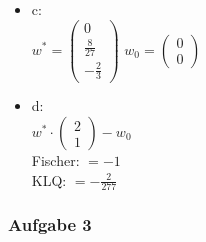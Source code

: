\documentclass{article}
\begin{document}
\begin{itemize}
	
	\item c: \\ 
		$w^* = 
		\begin{pmatrix}
			0 \\
			\frac{8}{27} \\
			-\frac{2}{3}
		\end{pmatrix}$
		$w_0 = 
			\begin{pmatrix}
			0 \\
			0
			\end{pmatrix}$
	\item d: \\
		$w^* \cdot \begin{pmatrix}
			2\\1
		\end{pmatrix} - w_0$
		\\
		Fischer: 
		$= -1$
		\\
		KLQ:
		$= -\frac{2}{277}$
		\\
\end{itemize}

\newpage
\subsubsection{Aufgabe 3}
\end{document}
